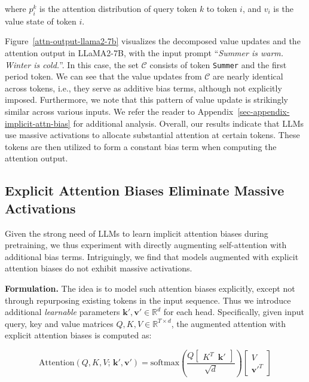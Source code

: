 where $p^{k}_{i}$ is the attention distribution of query token $k$ to token $i$, and $v_{i}$ is the value state of token $i$. 

Figure~\ref{attn-output-llama2-7b} visualizes the decomposed value updates and the attention output in LLaMA2-7B, with the input prompt ``\textsl{Summer is warm. Winter is cold.}''. In this case, the set $\mathcal{C}$ consists of token \texttt{Summer} and the first period token. We can see that the value updates from $\mathcal{C}$ are nearly identical across tokens, i.e., they serve as additive bias terms, although not explicitly imposed. Furthermore, we note that this pattern of value update is strikingly similar across various inputs. We refer the reader to Appendix~\ref{sec-appendix-implicit-attn-bias} for additional analysis. Overall, our results indicate that LLMs use massive activations to allocate substantial attention at certain tokens. These tokens are then utilized to form a constant bias term when computing the attention output.

\subsection{Explicit Attention Biases Eliminate Massive Activations}\label{sec-explicit-attn-bias}

Given the strong need of LLMs to learn implicit attention biases during pretraining, we thus experiment with directly augmenting self-attention with additional bias terms. Intriguingly, we find that models augmented with explicit attention biases do not exhibit massive activations.

\textbf{Formulation.} The idea is to model such attention biases explicitly, except not through repurposing existing tokens in the input sequence. Thus we introduce additional \textit{learnable} parameters $\mathbf{k'}, \mathbf{v'}\in \mathbb{R}^{d}$ for each head. Specifically, given input query, key and value matrices $Q,K,V\in \mathbb{R}^{T\times d}$, the augmented attention with explicit attention biases is computed as:

\begin{equation}\label{eq-attn-bias}
    \text{Attention}(Q, K, V;\, \mathbf{k'}, \mathbf{v'}) = \text{softmax}\left(\frac{Q \begin{bmatrix}
        K^{T}\,\,\,\mathbf{k'}
    \end{bmatrix}}{\sqrt{d}}\right)\begin{bmatrix}
        V \\ 
        \mathbf{v'}^{T}   \end{bmatrix}
\end{equation}

